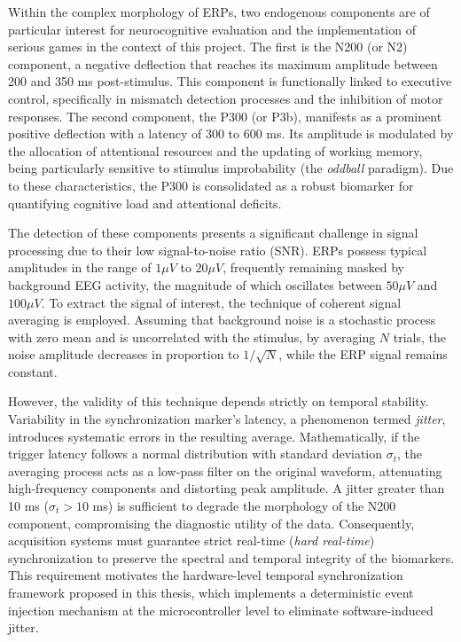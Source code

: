 Within the complex morphology of ERPs, two endogenous components are of particular interest for neurocognitive evaluation and the implementation of serious games in the context of this project. The first is the N200 (or N2) component, a negative deflection that reaches its maximum amplitude between 200 and 350 ms post-stimulus. This component is functionally linked to executive control, specifically in mismatch detection processes and the inhibition of motor responses. The second component, the P300 (or P3b), manifests as a prominent positive deflection with a latency of 300 to 600 ms. Its amplitude is modulated by the allocation of attentional resources and the updating of working memory, being particularly sensitive to stimulus improbability (the \textit{oddball} paradigm). Due to these characteristics, the P300 is consolidated as a robust biomarker for quantifying cognitive load and attentional deficits.

The detection of these components presents a significant challenge in signal processing due to their low signal-to-noise ratio (SNR). ERPs possess typical amplitudes in the range of $1\mu V$ to $20\mu V$, frequently remaining masked by background EEG activity, the magnitude of which oscillates between $50\mu V$ and $100\mu V$. To extract the signal of interest, the technique of coherent signal averaging is employed. Assuming that background noise is a stochastic process with zero mean and is uncorrelated with the stimulus, by averaging $N$ trials, the noise amplitude decreases in proportion to $1/\sqrt{N}$, while the ERP signal remains constant.

However, the validity of this technique depends strictly on temporal stability. Variability in the synchronization marker's latency, a phenomenon termed \textit{jitter}, introduces systematic errors in the resulting average. Mathematically, if the trigger latency follows a normal distribution with standard deviation $\sigma_t$, the averaging process acts as a low-pass filter on the original waveform, attenuating high-frequency components and distorting peak amplitude. A jitter greater than 10 ms ($\sigma_t > 10$ ms) is sufficient to degrade the morphology of the N200 component, compromising the diagnostic utility of the data. Consequently, acquisition systems must guarantee strict real-time (\textit{hard real-time}) synchronization to preserve the spectral and temporal integrity of the biomarkers. This requirement motivates the hardware-level temporal synchronization framework proposed in this thesis, which implements a deterministic event injection mechanism at the microcontroller level to eliminate software-induced jitter.

